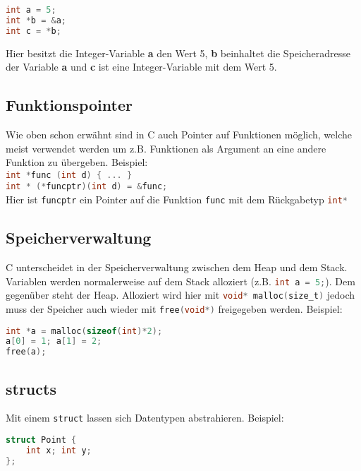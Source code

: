 \documentclass[11pt]{scrartcl}
\begin{document}
\begin{lstlisting}[language=C]
int a = 5;
int *b = &a;
int c = *b;
\end{lstlisting}

Hier besitzt die Integer-Variable \textbf a den Wert 5, \textbf b beinhaltet die Speicheradresse der Variable \textbf a und \textbf c ist eine Integer-Variable mit dem Wert 5.

\subsection{Funktionspointer}
Wie oben schon erwähnt sind in C auch Pointer auf Funktionen möglich, welche meist verwendet werden um z.B. Funktionen als Argument an eine andere Funktion zu übergeben. Beispiel:\\

\lstinline[language=C]!int *func (int d) { ... }!\\

\lstinline[language=C]!int * (*funcptr)(int d) = &func;! \\

Hier ist \lstinline[language=C]!funcptr! ein Pointer auf die Funktion \lstinline[language=C]!func! mit dem Rückgabetyp \lstinline[language=C]!int*!

\subsection{Speicherverwaltung}
C unterscheidet in der Speicherverwaltung zwischen dem Heap und dem Stack. Variablen werden normalerweise auf dem Stack alloziert (z.B. \lstinline[language=C]{int a = 5;}). Dem gegenüber steht der Heap. Alloziert wird hier mit \lstinline[language=C]{void* malloc(size_t)} jedoch muss der Speicher auch wieder mit \lstinline[language=C]{free(void*)} freigegeben werden. Beispiel:\\

\begin{lstlisting}[language=C]
int *a = malloc(sizeof(int)*2);
a[0] = 1; a[1] = 2;
free(a);
\end{lstlisting}

\subsection{structs}
Mit einem \texttt{struct} lassen sich Datentypen abstrahieren. Beispiel:\\

\begin{lstlisting}[language=C]
struct Point {
	int x; int y;
};
\end{lstlisting}
\end{document}
